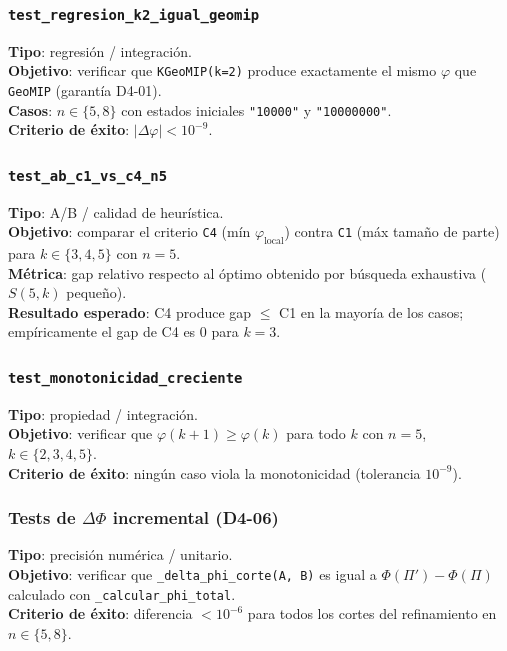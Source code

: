 \subsubsection*{\texttt{test\_regresion\_k2\_igual\_geomip}}

\textbf{Tipo}: regresión / integración. \\
\textbf{Objetivo}: verificar que \texttt{KGeoMIP(k=2)} produce exactamente el
mismo $\varphi$ que \texttt{GeoMIP} (garantía D4-01). \\
\textbf{Casos}: $n \in \{5, 8\}$ con estados iniciales \texttt{"10000"} y
\texttt{"10000000"}. \\
\textbf{Criterio de éxito}: $|\Delta\varphi| < 10^{-9}$.

\subsubsection*{\texttt{test\_ab\_c1\_vs\_c4\_n5}}

\textbf{Tipo}: A/B / calidad de heurística. \\
\textbf{Objetivo}: comparar el criterio \texttt{C4} (mín $\varphi_{\text{local}}$)
contra \texttt{C1} (máx tamaño de parte) para $k \in \{3, 4, 5\}$ con $n=5$. \\
\textbf{Métrica}: gap relativo respecto al óptimo obtenido por búsqueda exhaustiva
($S(5,k)$ pequeño). \\
\textbf{Resultado esperado}: C4 produce gap $\le$ C1 en la mayoría de los casos;
empíricamente el gap de C4 es 0 para $k=3$.

\subsubsection*{\texttt{test\_monotonicidad\_creciente}}

\textbf{Tipo}: propiedad / integración. \\
\textbf{Objetivo}: verificar que $\varphi(k+1) \ge \varphi(k)$ para todo $k$
con $n=5$, $k \in \{2, 3, 4, 5\}$. \\
\textbf{Criterio de éxito}: ningún caso viola la monotonicidad (tolerancia $10^{-9}$).

\subsubsection*{Tests de $\Delta\Phi$ incremental (D4-06)}

\textbf{Tipo}: precisión numérica / unitario. \\
\textbf{Objetivo}: verificar que \texttt{\_delta\_phi\_corte(A, B)} es igual a
$\Phi(\Pi') - \Phi(\Pi)$ calculado con \texttt{\_calcular\_phi\_total}. \\
\textbf{Criterio de éxito}: diferencia $< 10^{-6}$ para todos los cortes del
refinamiento en $n \in \{5, 8\}$.

